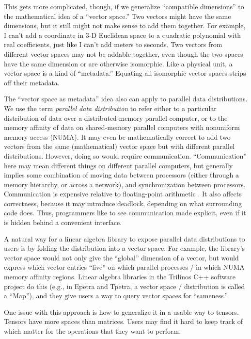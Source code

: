 This gets more complicated, though, if we generalize ``compatible
dimensions'' to the mathematical idea of a ``vector space.''  Two
vectors might have the same dimensions, but it still might not make
sense to add them together.  For example, I can't add a coordinate in
3-D Euclidean space to a quadratic polynomial with real coefficients,
just like I can't add meters to seconds.  Two vectors from different
vector spaces may not be addable together, even though the two spaces
have the same dimension or are otherwise isomorphic.  Like a physical
unit, a vector space is a kind of ``metadata.''  Equating all
isomorphic vector spaces strips off their metadata.

The ``vector space as metadata'' idea also can apply to parallel data
distributions.  We use the term \emph{parallel data distribution} to
refer either to a particular distribution of data over a
distributed-memory parallel computer, or to the memory affinity of
data on shared-memory parallel computers with nonuniform memory access
(NUMA).  It may even be mathematically correct to add two vectors from
the same (mathematical) vector space but with different parallel
distributions.  However, doing so would require communication.
``Communication'' here may mean different things on different parallel
computers, but generally implies some combination of moving data
between processors (either through a memory hierarchy, or across a
network), and synchronization between processors.  Communication is
expensive relative to floating-point arithmetic
\cite{wulf1995hitting,Blackford1997}.  It also affects correctness,
because it may introduce deadlock, depending on what surrounding code
does.  Thus, programmers like to see communication made explicit, even
if it is hidden behind a convenient interface.

A natural way for a linear algebra library to expose parallel data
distributions to users is by folding the distribution into a vector
space.  For example, the library's vector space would not only give
the ``global'' dimension of a vector, but would express which vector
entries ``live'' on which parallel processes / in which NUMA memory
affinity regions.  Linear algebra libraries in the Trilinos C++
software project \cite{heroux2005trilinos} do this (e.g., in Epetra
and Tpetra, a vector space / distribution is called a ``Map''), and
they give users a way to query vector spaces for ``sameness.''

One issue with this approach is how to generalize it in a usable way
to tensors.  Tensors have more spaces than matrices.  Users may find
it hard to keep track of which matter for the operations that they
want to perform.

